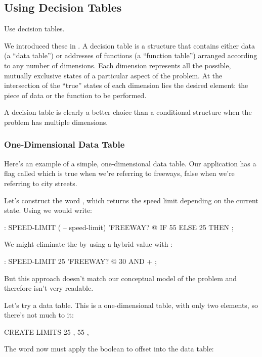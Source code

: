 \subsection{Using Decision Tables}%
%

\begin{tip}
Use decision tables.
\end{tip}
We introduced these in . A decision table is a structure that
contains either data (a ``data table'') or addresses of functions (a
``function table'') arranged according to any number of dimensions. Each
dimension represents all the possible, mutually exclusive states of a
particular aspect of the problem. At the intersection of the ``true''
states of each dimension lies the desired element: the piece of data or
the function to be performed.

A decision table is clearly a better choice than a conditional structure
when the problem has multiple dimensions.

\subsubsection{One-Dimensional Data Table}

Here's an example of a simple, one-dimensional data table. Our application
has a flag called  which is true when we're referring to
freeways, false when we're referring to city streets.

Let's construct the word , which returns the speed
limit depending on the current state.
Using  we would write:

\begin{Code}
: SPEED-LIMIT  ( -- speed-limit)
     'FREEWAY? @  IF  55  ELSE  25  THEN ;
\end{Code}
We might eliminate the  by using a hybrid value
with :

\begin{Code}
: SPEED-LIMIT   25  'FREEWAY? @  30 AND + ;
\end{Code}
But this approach doesn't match our conceptual model of the problem
and therefore isn't very readable.

Let's try a data table. This is a one-dimensional table, with only two
elements, so there's not much to it:

\begin{Code}
CREATE LIMITS   25 ,  55 ,
\end{Code}
The word  now must apply the boolean to offset into
the data table:

